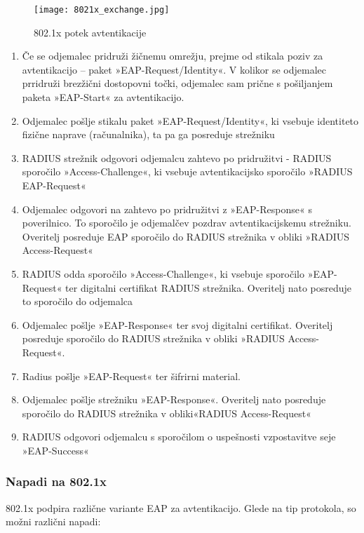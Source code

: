 \documentclass[12pt]{article}
\begin{document}
\begin{figure}[htb]
\begin{center}
\texttt{[image: 8021x\_exchange.jpg]}
\end{center}
\caption{802.1x potek avtentikacije}
\label{802.1x_exchange}
\end{figure}

\begin{enumerate}
    \item Če se odjemalec pridruži žičnemu omrežju, prejme od stikala poziv za avtentikacijo – paket »EAP-Request/Identity«. V kolikor se odjemalec prridruži brezžični dostopovni točki, odjemalec sam prične s pošiljanjem paketa »EAP-Start« za avtentikacijo.
    \item Odjemalec pošlje stikalu paket »EAP-Request/Identity«, ki vsebuje identiteto fizične naprave (računalnika), ta pa ga posreduje strežniku
    \item RADIUS strežnik odgovori odjemalcu zahtevo po pridružitvi - RADIUS sporočilo »Access-Challenge«, ki vsebuje avtentikacijsko sporočilo »RADIUS EAP-Request«
    \item Odjemalec odgovori na zahtevo po pridružitvi z »EAP-Response« s poverilnico. To sporočilo je odjemalčev pozdrav avtentikacijskemu strežniku. Overitelj posreduje EAP sporočilo do RADIUS strežnika v obliki »RADIUS Access-Request«
    \item RADIUS odda sporočilo »Access-Challenge«, ki vsebuje sporočilo »EAP-Request« ter digitalni certifikat RADIUS strežnika. Overitelj nato posreduje to sporočilo do odjemalca
    \item Odjemalec pošlje »EAP-Response« ter svoj digitalni certifikat. Overitelj posreduje sporočilo do RADIUS strežnika v obliki »RADIUS Access-Request«.
    \item Radius pošlje »EAP-Request« ter šifrirni material.
    \item Odjemalec pošlje strežniku »EAP-Response«. Overitelj nato posreduje sporočilo do RADIUS strežnika v obliki«RADIUS Access-Request«
    \item RADIUS odgovori odjemalcu s sporočilom o uspešnosti vzpostavitve seje »EAP-Success«
\end{enumerate}

\subsubsection{Napadi na 802.1x}

802.1x podpira različne variante EAP za avtentikacijo. Glede na tip protokola, so možni različni napadi:
\end{document}
